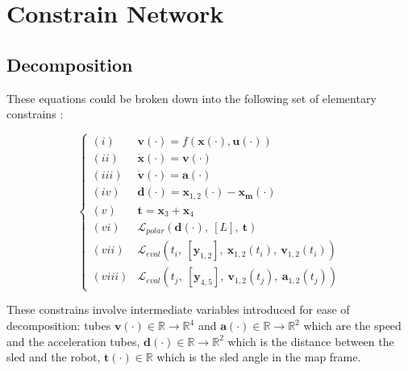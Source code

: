 \section*{Constrain Network}
    \subsection{Decomposition}
        These equations could be broken down into the following set of elementary constrains :

        \begin{equation}
            \label{eqn:constrains}
            \begin{cases}
                (\mathit{i}) & \mathbf{v}(\cdot) = f(\mathbf{x}(\cdot), \mathbf{u}(\cdot)) \\
                (\mathit{ii}) & \dot{\mathbf{x}}(\cdot) = \mathbf{v}(\cdot) \\
                (\mathit{iii}) & \dot{\mathbf{v}}(\cdot) = \mathbf{a}(\cdot) \\
                (\mathit{iv}) &  \mathbf{d} (\cdot)= \mathbf{x}_{1,2}(\cdot) - \mathbf{x_m}(\cdot) \\
                (\mathit{v}) & \mathbf{t} = \mathbf{x}_3+\mathbf{x}_4 \\
                (\mathit{vi}) & \mathcal{L}_{polar}\left(\mathbf{d}(\cdot),\ [L],\ \mathbf{t}\right) \\
                (\mathit{vii}) & \mathcal{L}_{eval}\left(t_i,\ [\textbf{y}_{1,2}],\ \mathbf{x}_{1,2}(t_i),\ \mathbf{v}_{1,2}(t_i)\right) \\
                (\mathit{viii}) & \mathcal{L}_{eval}\left(t_j,\ [\textbf{y}_{4,5}],\ \mathbf{v}_{1,2}(t_j),\ \mathbf{a}_{1,2}(t_j)\right)
            \end{cases}
        \end{equation}

        These constrains involve intermediate variables introduced for ease of decomposition: tubes $\mathbf{v}(\cdot) \in \mathbb{R} \rightarrow \mathbb{R}^4$ and $\mathbf{a}(\cdot) \in \mathbb{R} \rightarrow \mathbb{R}^2$ which are the speed and the acceleration tubes, $\mathbf{d}(\cdot) \in \mathbb{R} \rightarrow \mathbb{R}^2$ which is the distance between the sled and the robot, $\mathbf{t}(\cdot) \in \mathbb{R}$ which is the sled angle in the map frame.